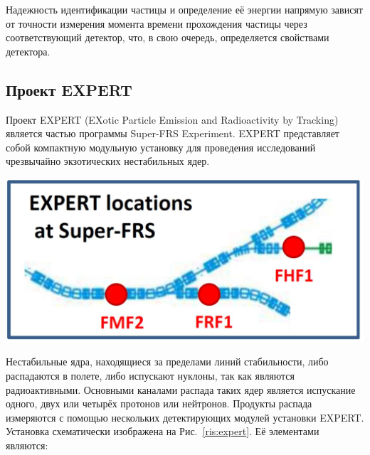 Надежность идентификации частицы и определение её энергии напрямую зависят от точности измерения момента времени прохождения частицы через соответствующий детектор, что, в свою очередь, определяется свойствами детектора.

\subsection{Проект EXPERT}
Проект EXPERT (EXotic Particle Emission and Radioactivity by Tracking) является частью программы Super-FRS Experiment. EXPERT представляет собой компактную модульную установку для проведения исследований чрезвычайно экзотических нестабильных ядер. 


{
	\centering
	\includegraphics[width=1\linewidth]{frsexpert.png}
	\label{ris:frsexpert}
}

Нестабильные ядра, находящиеся за пределами линий стабильности, либо распадаются в полете, либо испускают нуклоны, так как являются радиоактивными. Основными каналами распада таких ядер является испускание одного, двух или четырёх протонов или нейтронов. Продукты распада измеряются с помощью нескольких детектирующих модулей установки EXPERT. Установка схематически изображена на Рис.~\ref{ris:expert}. Её элементами  являются:


